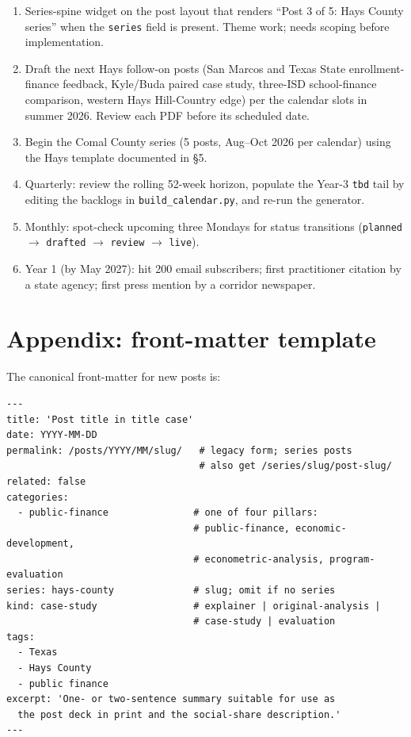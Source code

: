 \documentclass[11pt]{article}
\begin{document}
\begin{enumerate}
\item Series-spine widget on the post layout that renders ``Post 3
of 5: Hays County series'' when the \texttt{series} field is
present. Theme work; needs scoping before implementation.

\item Draft the next Hays follow-on posts (San Marcos and Texas
State enrollment-finance feedback, Kyle/Buda paired case study,
three-ISD school-finance comparison, western Hays Hill-Country
edge) per the calendar slots in summer 2026. Review each PDF
before its scheduled date.

\item Begin the Comal County series (5 posts, Aug--Oct 2026 per
calendar) using the Hays template documented in \S 5.

\item Quarterly: review the rolling 52-week horizon, populate the
Year-3 \texttt{tbd} tail by editing the backlogs in
\texttt{build\_calendar.py}, and re-run the generator.

\item Monthly: spot-check upcoming three Mondays for status
transitions (\texttt{planned} $\to$ \texttt{drafted} $\to$
\texttt{review} $\to$ \texttt{live}).

\item Year 1 (by May 2027): hit 200 email subscribers; first
practitioner citation by a state agency; first press mention by a
corridor newspaper.
\end{enumerate}

\appendix
\section{Appendix: front-matter template}

The canonical front-matter for new posts is:

\begin{verbatim}
---
title: 'Post title in title case'
date: YYYY-MM-DD
permalink: /posts/YYYY/MM/slug/   # legacy form; series posts
                                  # also get /series/slug/post-slug/
related: false
categories:
  - public-finance               # one of four pillars:
                                 # public-finance, economic-development,
                                 # econometric-analysis, program-evaluation
series: hays-county              # slug; omit if no series
kind: case-study                 # explainer | original-analysis |
                                 # case-study | evaluation
tags:
  - Texas
  - Hays County
  - public finance
excerpt: 'One- or two-sentence summary suitable for use as
  the post deck in print and the social-share description.'
---
\end{verbatim}
\end{document}
